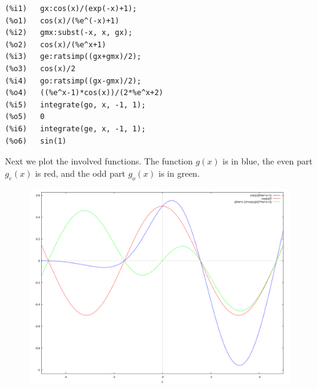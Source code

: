 \begin{verbatim}
(%i1)	gx:cos(x)/(exp(-x)+1);
(%o1)	cos(x)/(%e^(-x)+1)
(%i2)	gmx:subst(-x, x, gx);
(%o2)	cos(x)/(%e^x+1)
(%i3)	ge:ratsimp((gx+gmx)/2);
(%o3)	cos(x)/2
(%i4)	go:ratsimp((gx-gmx)/2);
(%o4)	((%e^x-1)*cos(x))/(2*%e^x+2)
(%i5)	integrate(go, x, -1, 1);
(%o5)	0
(%i6)	integrate(ge, x, -1, 1);
(%o6)	sin(1)
\end{verbatim}

Next we plot the involved functions. The function $g(x)$ is in blue, the even part $g_e(x)$ is red, and the odd part $g_o(x)$ is in green.

\begin{figure}
\includegraphics[scale=0.3]{images/2016-02-09_plot_1.png}
\end{figure}





